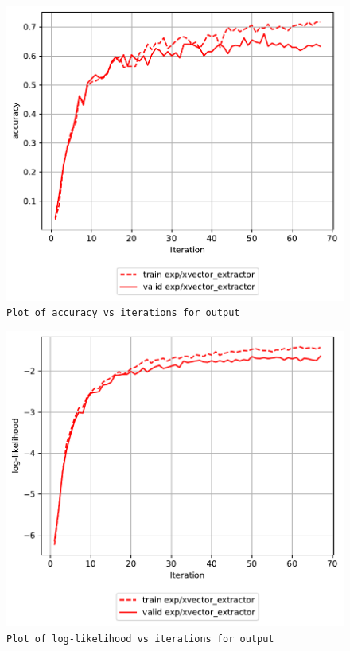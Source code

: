 \documentclass[prl,10pt,twocolumn]{revtex4}
\begin{document}
\newpage
\begin{figure}[h]
  \begin{center}
    \caption{\texttt{Plot of accuracy vs iterations for output}}
    \includegraphics[width=\textwidth]{exp/xvector_extractor/report/accuracy_output.pdf}
  \end{center}
\end{figure}
\clearpage


\newpage
\begin{figure}[h]
  \begin{center}
    \caption{\texttt{Plot of log-likelihood vs iterations for output}}
    \includegraphics[width=\textwidth]{exp/xvector_extractor/report/loglikelihood_output.pdf}
  \end{center}
\end{figure}
\clearpage
\end{document}
